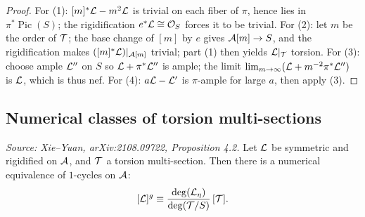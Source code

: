 \begin{proof}
  For (1): \([m]^*\mathcal{L} - m^2\mathcal{L}\) is trivial on each fiber of \(\pi\), hence lies in
  \(\pi^*\operatorname{Pic}(S)\); the rigidification \(e^*\mathcal{L} \cong \mathcal{O}_S\) forces it to be trivial.
  For (2): let \(m\) be the order of \(\mathcal{T}\); the base change of \([m]\) by \(e\) gives
  \(\mathcal{A}[m] \to S\), and the rigidification makes \(([m]^*\mathcal{L})|_{\mathcal{A}[m]}\) trivial; part (1)
  then yields \(\mathcal{L}|_{\mathcal{T}}\) torsion.
  For (3): choose ample \(\mathcal{L}''\) on \(S\) so \(\mathcal{L} + \pi^*\mathcal{L}''\) is ample; the limit
  \(\lim_{m\to\infty}({\mathcal{L} + m^{-2}\pi^*\mathcal{L}''})\) is \(\mathcal{L}\), which is thus nef.
  For (4): \(a\mathcal{L} - \mathcal{L}'\) is \(\pi\)-ample for large \(a\), then apply (3).
\end{proof}

\subsection{Numerical classes of torsion multi-sections}

\begin{proposition}
  \label{pro:numericalEquivalent}
  \textit{Source: Xie--Yuan, arXiv:2108.09722, Proposition 4.2.}
  Let \(\mathcal{L}\) be symmetric and rigidified on \(\mathcal{A}\), and \(\mathcal{T}\) a torsion multi-section.
  Then there is a numerical equivalence of \(1\)-cycles on \(\mathcal{A}\):
  \[
    [\mathcal{L}]^g \equiv \frac{\deg(\mathcal{L}_\eta)}{\deg(\mathcal{T}/S)}\,[\mathcal{T}].
  \]
\end{proposition}

